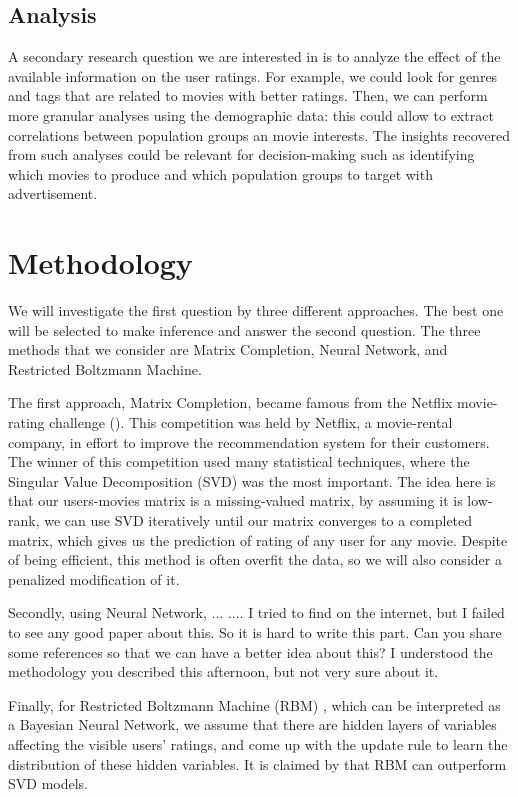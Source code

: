 \documentclass[bj, preprint]{imsart}
\begin{document}
\subsection{Analysis}

A secondary research question we are interested in is to analyze the effect of the available information on the user ratings. For example, we could look for genres and tags that are related to movies with better ratings. Then, we can perform more granular analyses using the demographic data: this could allow to extract correlations between population groups an movie interests. The insights recovered from such analyses could be relevant for decision-making such as identifying which movies to produce and which population groups to target with advertisement.

\section{Methodology}\label{sec:setting}
We will investigate the first question by three different approaches. The best one will be selected to make inference and answer the second question. The three methods that we consider are Matrix Completion, Neural Network, and Restricted Boltzmann Machine. 

The first approach, Matrix Completion, became famous from the Netflix movie-rating challenge (\cite{bennett2007netflix}). This competition was held by Netflix, a movie-rental company, in effort to improve the recommendation system for their customers. The winner of this competition used many statistical techniques, where the Singular Value Decomposition (SVD) was the most important. The idea here is that our users-movies matrix is a missing-valued matrix, by assuming it is low-rank, we can use SVD iteratively until our matrix converges to a completed matrix, which gives us the prediction of rating of any user for any movie. Despite of being efficient, this method is often overfit the data, so we will also consider a penalized modification of it.

Secondly, using Neural Network, ... .... I tried to find on the internet, but I failed to see any good paper about this. So it is hard to write this part. Can you share some references so that we can have a better idea about this? I understood the methodology you described this afternoon, but not very sure about it. 

Finally, for Restricted Boltzmann Machine (RBM) \cite{10.1145/1273496.1273596}, which can be interpreted as a Bayesian Neural Network, we assume that there are hidden layers of variables affecting the visible users' ratings, and come up with the update rule to learn the distribution of these hidden variables. It is claimed by \cite{10.1145/1273496.1273596} that RBM can outperform SVD models. 
\end{document}
